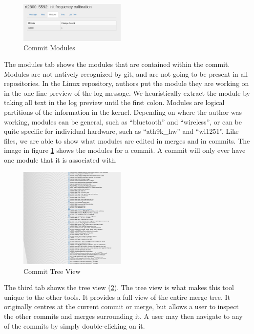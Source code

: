 \documentclass[conference, draftclsnofoot]{IEEEtran}
\begin{document}
\begin{figure}[h]
	\centering
	\includegraphics[width=0.47\textwidth]{figures/modules.png}
	\caption{Commit Modules}
	\label{fig:modules}
\end{figure}

The modules tab shows the modules that are contained within the commit. Modules
are not natively recognized by git, and are not going to be present in all
repositories. In the Linux repository, authors put the module they are working
on in the one-line preview of the log-message.  We heuristically extract the
module by taking all text in the log preview until the first colon. Modules are
logical partitions of the information in the kernel. Depending on where the
author was working, modules can be general, such as ``bluetooth'' and
``wireless'', or can be quite specific for individual hardware, such as
``ath9k\_hw'' and ``wl1251''. Like files, we are able to show what modules are
edited in merges and in commits. The image in figure \ref{fig:modules} shows
the modules for a commit. A commit will only ever have one module that it is
associated with.

\begin{figure}[h]
	\centering
	\includegraphics[width=0.47\textwidth]{figures/tree_view.png}
	\caption{Commit Tree View}
	\label{fig:tree}
\end{figure}

The third tab shows the tree view (\ref{fig:tree}). The tree view is what makes
this tool unique to the other tools. It provides a full view of the entire
merge tree. It originally centres at the current commit or merge, but allows a
user to inspect the other commits and merges surrounding it. A user may then
navigate to any of the commits by simply double-clicking on it.
\end{document}
